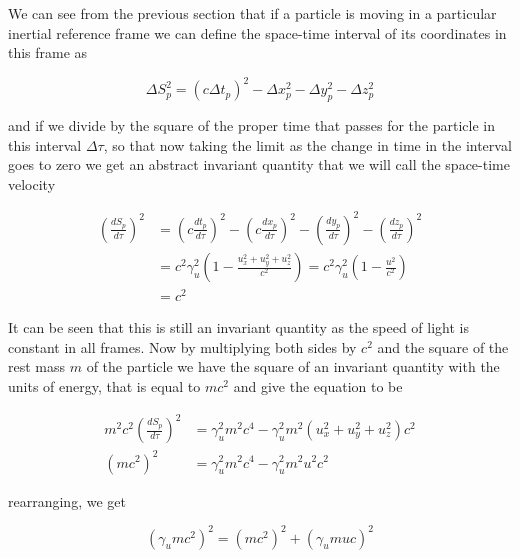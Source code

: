 We can see from the previous section that if a particle is moving in a particular inertial reference frame we can define the space-time interval of its coordinates in this frame as

\begin{equation}
	\Delta S_p^2 = (c\Delta t_p)^2 -\Delta x_p^2 -\Delta y_p^2 -\Delta z_p^2
\end{equation}

and if we divide by the square of the proper time that passes for the particle in this interval $\Delta\tau$, so that now taking the limit as the change in time in the interval goes to zero we get an abstract invariant quantity that we will call the space-time velocity

\begin{equation}
	\begin{aligned}
		\left(\frac{dS_p}{d\tau}\right)^2 & =  \left(c\frac{dt_p}{d\tau}\right)^2 - \left(c\frac{dx_p}{d\tau}\right)^2 - \left(\frac{dy_p}{d\tau}\right)^2 - \left(\frac{dz_p}{d\tau}\right)^2 \\
		                                  & = c^2\gamma_{u}^2 \left( 1 - \frac{u_x^2 + u_y^2 + u_z^2}{c^2} \right) = c^2\gamma_{u}^2 \left( 1 - \frac{u^2}{c^2} \right)                        \\
		                                  & = c^2
	\end{aligned}
\end{equation}

It can be seen that this is still an invariant quantity as the speed of light is constant in all frames. Now by multiplying both sides by $c^2$ and the square of the rest mass $m$ of the particle we have the square of an invariant quantity with the units of energy, that is equal to $mc^2$ and give the equation to be

\begin{equation}
	\label{eq: energy-momentum derivation}
	\begin{aligned}
		m^2 c^2 \left(\frac{dS_p}{d\tau}\right)^2 & =  \gamma_{u}^2 m^2 c^4 - \gamma_{u}^2 m^2 \left( u_x^2 + u_y^2 + u_z^2 \right) c^2 \\
		(mc^2)^2                                  & =  \gamma_{u}^2 m^2 c^4 - \gamma_{u}^2 m^2 u^2 c^2
	\end{aligned}
\end{equation}

rearranging, we get

\begin{equation}
	\label{eq: total relativistic energy}
	\left( \gamma_{u} m c^2 \right)^2 = (mc^2)^2 + \left( \gamma_{u} m u c \right)^2
\end{equation}

